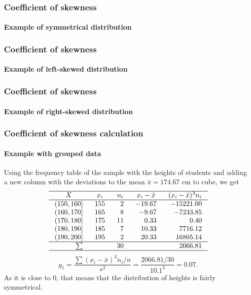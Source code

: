 \begin{frame}
\frametitle{Coefficient of skewness}
\framesubtitle{Example of symmetrical distribution}
\begin{center}
\scalebox{0.6}{}
\end{center}
\end{frame} 


\begin{frame}
\frametitle{Coefficient of skewness}
\framesubtitle{Example of left-skewed distribution}
\begin{center}
\scalebox{0.6}{}
\end{center}
\end{frame} 


\begin{frame}
\frametitle{Coefficient of skewness}
\framesubtitle{Example of right-skewed distribution}
\begin{center}
\scalebox{0.6}{}
\end{center}
\end{frame}


\begin{frame}
\frametitle{Coefficient of skewness calculation}
\framesubtitle{Example with grouped data}
Using the frequency table of the sample with the heights of students and adding a new column with the deviations to
the mean $\bar x = 174.67$ cm to cube, we get
\[
\setlength\arraycolsep{3mm}
\setlength\arrayrulewidth{0.5pt}
\begin{array}{rrrrr}
\hline
\multicolumn{1}{c}{X} & \multicolumn{1}{c}{x_i} & \multicolumn{1}{c}{n_i} & \multicolumn{1}{c}{x_i-\bar x} & \multicolumn{1}{c}{(x_i-\bar x)^3 n_i} \\
\hline
(150,160] & 155 & 2 & -19.67 & -15221.00\\
(160,170] & 165 & 8 & -9.67 & -7233.85\\
(170,180] & 175 & 11 & 0.33 & 0.40\\
(180,190] & 185 & 7 & 10.33 & 7716.12\\
(190,200] & 195 & 2 & 20.33 & 16805.14\\
\hline
\sum &  & 30 & & 2066.81 \\
\hline
\end{array}
\]
\[
g_1 = \frac{\sum (x_i-\bar x)^3n_i/n}{s^3} = \frac{2066.81/30}{10.1^3} = 0.07.
\]
As it is close to 0, that means that the distribution of heights is fairly symmetrical. 
\end{frame}


